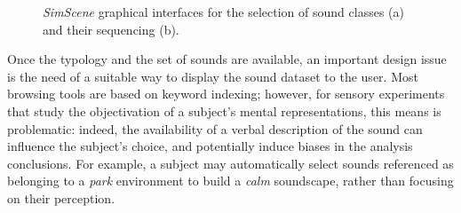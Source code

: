 \documentclass[12pt]{elsarticle}
\newcommand{\myfloatalign}{\centering}
\begin{document}
\begin{figure}[!tp]
		\myfloatalign
         \par
       \caption{\emph{SimScene} graphical interfaces for the selection of sound classes (a) and their sequencing (b).}
\end{figure}



Once the typology and the set of sounds are available, an important design issue is the need of a suitable way to display the sound dataset to the user. Most browsing tools are based on keyword indexing; however, for sensory experiments that study the objectivation of a subject's mental representations, this means is problematic: indeed, the availability of a verbal description of the sound can influence the subject's choice, and potentially induce biases in the analysis conclusions. For example, a subject may automatically select sounds referenced as belonging to a \emph{park} environment to build a \emph{calm} soundscape, rather than focusing on their perception.
\end{document}
